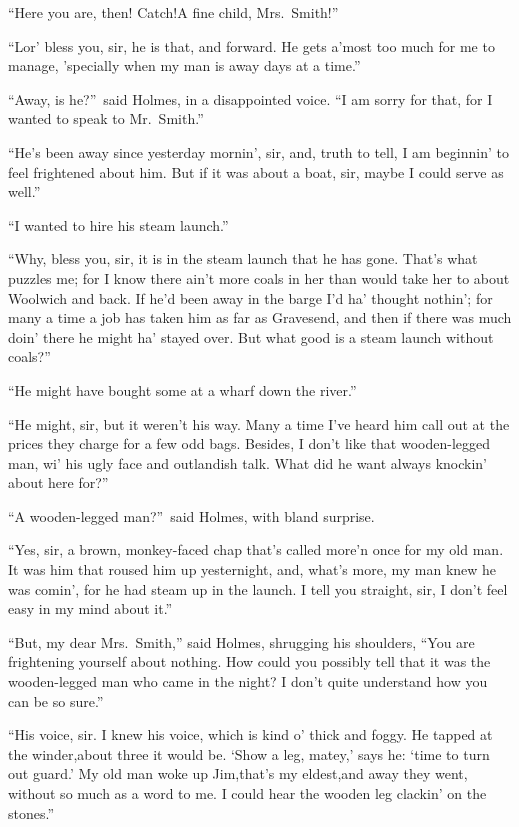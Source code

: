 \documentclass[12pt,english,oneside]{book}
\begin{document}
{}``Here you are, then! Catch!\mdsh{---}A fine child, Mrs.\ Smith!''

{}``Lor' bless you, sir, he is that, and forward. He gets a'most
too much for me to manage, 'specially when my man is away days at
a time.''

{}``Away, is he?''\ said Holmes, in a disappointed voice. {}``I
am sorry for that, for I wanted to speak to Mr.\ Smith.''

{}``He's been away since yesterday mornin', sir, and, truth to tell,
I am beginnin' to feel frightened about him. But if it was about a
boat, sir, maybe I could serve as well.''

{}``I wanted to hire his steam launch.''

{}``Why, bless you, sir, it is in the steam launch that he has gone.
That's what puzzles me; for I know there ain't more coals in her than
would take her to about Woolwich and back. If he'd been away in the
barge I'd ha' thought nothin'; for many a time a job has taken him
as far as Gravesend, and then if there was much doin' there he might
ha' stayed over. But what good is a steam launch without coals?''

{}``He might have bought some at a wharf down the river.''

{}``He might, sir, but it weren't his way. Many a time I've heard
him call out at the prices they charge for a few odd bags. Besides,
I don't like that wooden-legged man, wi' his ugly face and outlandish
talk. What did he want always knockin' about here for?''

{}``A wooden-legged man?''\ said Holmes, with bland surprise.

{}``Yes, sir, a brown, monkey-faced chap that's called more'n once
for my old man. It was him that roused him up yesternight, and, what's
more, my man knew he was comin', for he had steam up in the launch.
I tell you straight, sir, I don't feel easy in my mind about it.''

{}``But, my dear Mrs.\ Smith,'' said Holmes, shrugging his shoulders,
{}``You are frightening yourself about nothing. How could you possibly
tell that it was the wooden-legged man who came in the night? I don't
quite understand how you can be so sure.''

{}``His voice, sir. I knew his voice, which is kind o' thick and
foggy. He tapped at the winder,\mdsh{---}about three it would be.
`Show a leg, matey,' says he: `time to turn out guard.' My old man
woke up Jim,\mdsh{---}that's my eldest,\mdsh{---}and away they went,
without so much as a word to me. I could hear the wooden leg clackin'
on the stones.''
\end{document}
